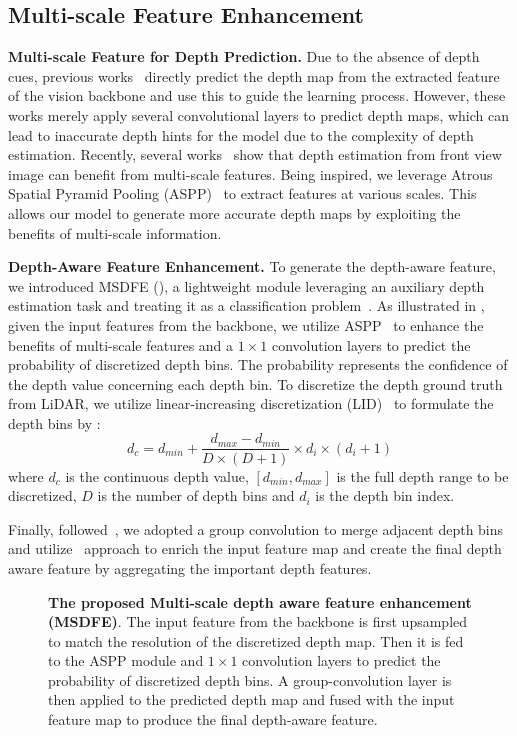 \subsection{Multi-scale Feature Enhancement} \label{sec:5.2.4}
\textbf{Multi-scale Feature for Depth Prediction.} Due to the absence of depth cues, previous works~\cite{MonoDTR,MonoDETR} directly predict the depth map from the extracted feature of the vision backbone and use this to guide the learning process. However, these works merely apply several convolutional layers to predict depth maps, which can lead to inaccurate depth hints for the model due to the complexity of depth estimation. Recently, several works~\cite{9897187,sagar2020monocular} show that depth estimation from front view image can benefit from multi-scale features. Being inspired, we leverage Atrous Spatial Pyramid Pooling (ASPP)~\cite{AstrousCNN} to extract features at various scales. This allows our model to generate more accurate depth maps by exploiting the benefits of multi-scale information.

\noindent\textbf{Depth-Aware Feature Enhancement.} To generate the depth-aware feature, we introduced MSDFE (), a lightweight module leveraging an auxiliary depth estimation task and treating it as a classification problem~\cite{depthOrdinal,CaDDN}. As illustrated in , given the input features from the backbone, we utilize ASPP~\cite{AstrousCNN} to enhance the benefits of multi-scale features and a $1\times 1$ convolution layers to predict the probability of discretized depth bins. The probability represents the confidence of the depth value concerning each depth bin. To discretize the depth ground truth from LiDAR, we utilize linear-increasing discretization (LID)~\cite{CaDDN,center3d} to formulate the depth bins by :
\begin{equation}
    d_c = d_{min} + \frac{d_{max}-d_{min}}{D\times(D+1)}\times d_i \times (d_i+1)
\label{eq:depth_discrete}
\end{equation}
where $d_c$ is the continuous depth value, $[d_{min},d_{max}]$  is the
full depth range to be discretized, $D$ is the number of depth
bins and $d_i$ is the depth bin index.

Finally, followed~\cite{MonoDTR}, we adopted a group convolution to merge adjacent depth bins and utilize~\cite{acfnet} approach to enrich the input feature map and create the final depth aware feature by aggregating the important depth features.
\begin{figure}[h!]
    \centering
    
    \caption{\textbf{The proposed Multi-scale depth aware feature enhancement (MSDFE)}. The input feature from the backbone is first upsampled to match the resolution of the discretized depth map. Then it is fed to the ASPP module and $1\times 1$ convolution layers to predict the probability of discretized depth bins. A group-convolution layer is then applied to the predicted depth map and fused with the input feature map to produce the final depth-aware feature.}
    \label{fig:MSDFE}
\end{figure}